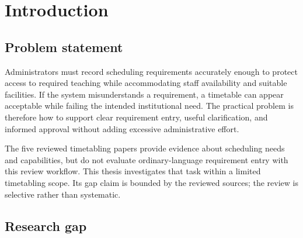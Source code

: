 \hypertarget{introduction}{%
\chapter{Introduction}\label{introduction}}


\hypertarget{problem-statement}{%
\section{Problem statement}\label{problem-statement}}

Administrators must record scheduling requirements accurately enough to protect access to required teaching while accommodating staff availability and suitable facilities. If the system misunderstands a requirement, a timetable can appear acceptable while failing the intended institutional need. The practical problem is therefore how to support clear requirement entry, useful clarification, and informed approval without adding excessive administrative effort.

The five reviewed timetabling papers provide evidence about scheduling needs and capabilities, but do not evaluate ordinary-language requirement entry with this review workflow. This thesis investigates that task within a limited timetabling scope. Its gap claim is bounded by the reviewed sources; the review is selective rather than systematic.

\hypertarget{research-gap}{%
\section{Research gap}\label{research-gap}}

